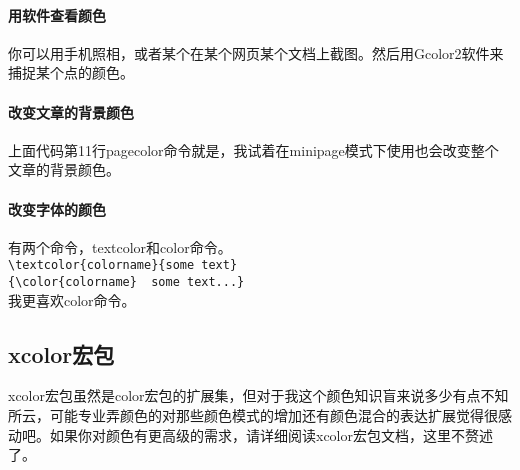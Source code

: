 \paragraph{用软件查看颜色}
你可以用手机照相，或者某个在某个网页某个文档上截图。然后用Gcolor2软件来捕捉某个点的颜色。

\paragraph{改变文章的背景颜色}
上面代码第11行pagecolor命令就是，我试着在minipage模式下使用也会改变整个文章的背景颜色。

\paragraph{改变字体的颜色}
有两个命令，textcolor和color命令。\\
\verb+\textcolor{colorname}{some text}+\\
\verb+{\color{colorname}  some text...}+\\
我更喜欢color命令。

\subsection{xcolor宏包}   
xcolor宏包虽然是color宏包的扩展集，但对于我这个颜色知识盲来说多少有点不知所云，可能专业弄颜色的对那些颜色模式的增加还有颜色混合的表达扩展觉得很感动吧。如果你对颜色有更高级的需求，请详细阅读xcolor宏包文档，这里不赘述了。

